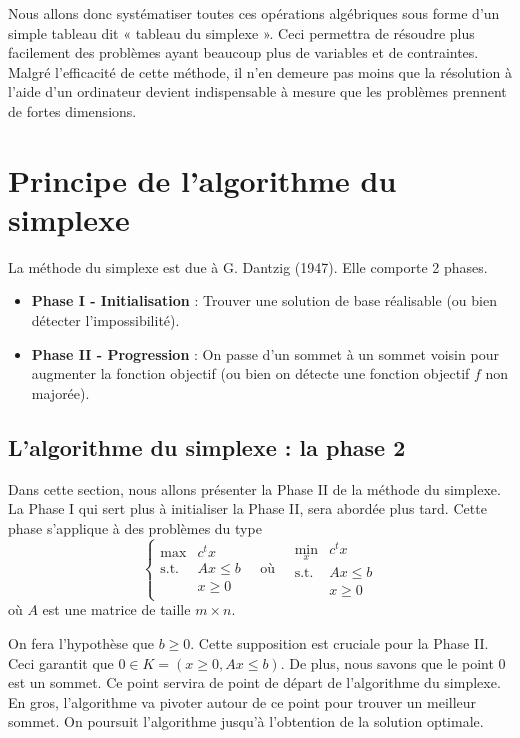 \documentclass[a4paper,12pt,openany]{book}
\theoremstyle{plain}
\theoremstyle{definition}
\theoremstyle{remark}
\theoremstyle{nbstyle}
\begin{document}
	Nous allons donc systématiser toutes ces opérations algébriques sous forme d'un simple tableau dit « tableau du simplexe ». Ceci permettra de résoudre plus facilement des problèmes ayant beaucoup plus de variables et de contraintes. Malgré l'efficacité de cette méthode, il n'en demeure pas moins que la résolution à l'aide d'un ordinateur devient indispensable à mesure que les problèmes prennent de fortes dimensions.
	
	\section{Principe de l'algorithme du simplexe}
	
	La méthode du simplexe est due à G. Dantzig (1947). Elle comporte 2 phases.
	\begin{itemize}
		\item \textbf{Phase I - Initialisation} : Trouver une solution de base réalisable (ou bien détecter l'impossibilité).
		\item \textbf{Phase II - Progression} : On passe d'un sommet à un sommet voisin pour augmenter la fonction objectif (ou bien on détecte une fonction objectif $f$ non majorée).
	\end{itemize}
	
	\subsection{L'algorithme du simplexe : la phase 2}
	
	Dans cette section, nous allons présenter la Phase II de la méthode du simplexe. La Phase I qui sert plus à initialiser la Phase II, sera abordée plus tard. Cette phase s'applique à des problèmes du type
	\[
	\left\{
	\begin{array}{rl}
	\displaystyle\max & c^{t} x \\
	\text{s.t.} & A x \leq b \\
	& x \geq 0
	\end{array}
	\quad \text{où} \quad
	\begin{array}{rl}
	\displaystyle\min_{x} & c^{t} x \\
	\text{s.t.} & A x \leq b \\
	& x \geq 0
	\end{array}
	\right.
	\]
	où $A$ est une matrice de taille $m \times n$.
	
	On fera l'hypothèse que $b \geq 0$. Cette supposition est cruciale pour la Phase II. Ceci garantit que $0 \in K = (x \geq 0, A x \leq b)$. De plus, nous savons que le point $0$ est un sommet. Ce point servira de point de départ de l'algorithme du simplexe. En gros, l'algorithme va pivoter autour de ce point pour trouver un meilleur sommet. On poursuit l'algorithme jusqu'à l'obtention de la solution optimale.
	
\end{document}

